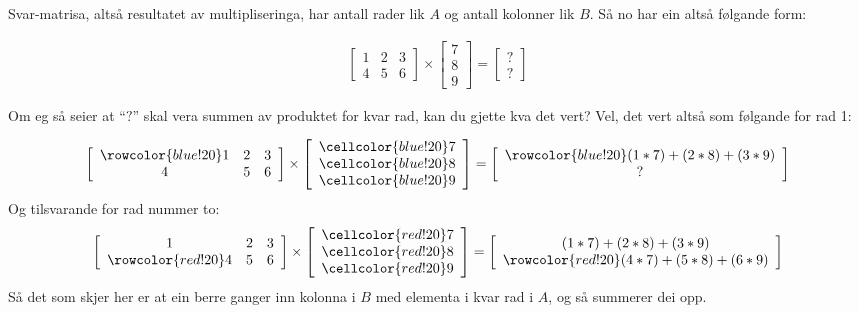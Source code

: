 \documentclass[12pt]{article}
\newcommand\x{\times}
\begin{document}
Svar-matrisa, altså resultatet av multipliseringa, har antall rader lik
$A$ og antall kolonner lik $B$. Så no har ein altså
følgande form:

\begin{gather*}
\left[ 
\begin{array}{ccc}
1 & 2 & 3 \\
4 & 5 & 6
\end{array}
 \right] \x
\left[ 
\begin{array}{ccc}
7 \\ 8 \\ 9
\end{array}
\right] =
\left[ 
\begin{array}{ccc}
? \\ ?
\end{array}
\right]
\end{gather*}

Om eg så seier at ``$?$'' skal vera summen av produktet for kvar rad, 
kan du gjette kva det vert? Vel, det vert altså som følgande for rad 1:

\begin{gather*}
\left[ 
\begin{array}{ccc}
\rowcolor{blue!20}1 & 2 & 3 \\
4 & 5 & 6
\end{array}
 \right] \x
\left[ 
\begin{array}{ccc}
\cellcolor{blue!20}7 \\ 
\cellcolor{blue!20} 8 \\ 
\cellcolor{blue!20} 9
\end{array}
\right] =
\left[ 
\begin{array}{ccc}
\rowcolor{blue!20}(1*7) + (2*8) + (3*9) \\
? \\
\end{array}
\right]
\end{gather*}
Og tilsvarande for rad nummer to:
\begin{gather*}
\left[ 
\begin{array}{ccc}
1 & 2 & 3 \\
\rowcolor{red!20}
4 & 5 & 6
\end{array}
 \right] \x
\left[ 
\begin{array}{ccc}
\cellcolor{red!20}7 \\ 
\cellcolor{red!20} 8 \\ 
\cellcolor{red!20} 9
\end{array}
\right] =
\left[ 
\begin{array}{ccc}
(1*7) + (2*8) + (3*9) \\
\rowcolor{red!20}
(4*7) + (5*8) + (6*9) \\
\end{array}
\right]
\end{gather*}
Så det som skjer her er at ein berre ganger inn kolonna i $B$ med elementa i kvar
rad i $A$, og så summerer dei opp.
\end{document}
